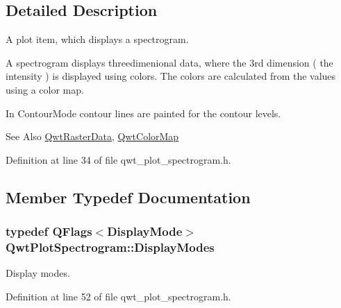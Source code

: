 \subsection{Detailed Description}
A plot item, which displays a spectrogram. 

A spectrogram displays threedimenional data, where the 3rd dimension ( the intensity ) is displayed using colors. The colors are calculated from the values using a color map.

In Contour\-Mode contour lines are painted for the contour levels.



\begin{DoxySeeAlso}{See Also}
\hyperlink{class_qwt_raster_data}{Qwt\-Raster\-Data}, \hyperlink{class_qwt_color_map}{Qwt\-Color\-Map} 
\end{DoxySeeAlso}


Definition at line 34 of file qwt\-\_\-plot\-\_\-spectrogram.\-h.



\subsection{Member Typedef Documentation}
\hypertarget{class_qwt_plot_spectrogram_a245a6d1281abe84d177d61be0698db55}{
\subsubsection[{Display\-Modes}]{\setlength{\rightskip}{0pt plus 5cm}typedef Q\-Flags$<${\bf Display\-Mode}$>$ {\bf Qwt\-Plot\-Spectrogram\-::\-Display\-Modes}}}\label{class_qwt_plot_spectrogram_a245a6d1281abe84d177d61be0698db55}


Display modes. 



Definition at line 52 of file qwt\-\_\-plot\-\_\-spectrogram.\-h.



